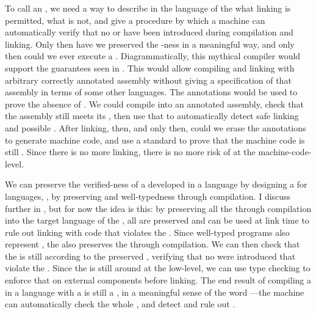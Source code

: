 To call an  , we need a way to describe in the
language of the  what linking is permitted, what is not, and
give a procedure by which a machine can automatically verify that no
 or  have been introduced during
compilation and linking.
Only then have we preserved the -ness in a meaningful way, and
only then could we ever execute a .
Diagrammatically, this mythical compiler would support the guarantees seen in
.
This would allow compiling and linking with arbitrary correctly annotated
assembly without giving a specification of that assembly in terms of some other
languages.
The annotations would be used to prove the absence of .
We could compile into an annotated assembly, check that the assembly still meets
its , then use that  to automatically
detect safe linking and possible .
After linking, then, and only then, could we erase the annotations to generate
machine code, and use a standard  to prove that the
machine code is still .
Since there is no more linking, there is no more risk of 
at the machine-code-level.

\FigMythDiagram
We can preserve the verified-ness of a  developed in a
 language by designing a 
 for  languages, \ie, by preserving
 and well-typedness through compilation.
I discuss  further in , but for
now the idea is this:
by preserving all the  through compilation into the target
language of the , all  are preserved and can
be used at link time to rule out linking with code that violates the
.
Since well-typed programs also represent , the  also
preserves the  through compilation.
We can then check that the  is still  according to the
preserved , verifying that no 
were introduced that violate the .
Since the  is still around at the low-level, we can use type
checking to enforce that  on external components before linking.
The end result of compiling a  in a  language with a   is still a
, in a meaningful sense of the word ---the
machine can automatically check the whole , and detect and rule out
.


